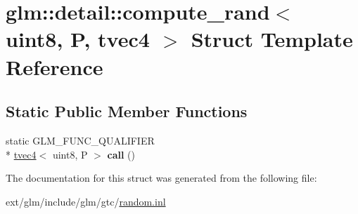 \hypertarget{structglm_1_1detail_1_1compute__rand_3_01uint8_00_01_p_00_01tvec4_01_4}{\section{glm\-:\-:detail\-:\-:compute\-\_\-rand$<$ uint8, P, tvec4 $>$ Struct Template Reference}
\label{structglm_1_1detail_1_1compute__rand_3_01uint8_00_01_p_00_01tvec4_01_4}
}
\subsection*{Static Public Member Functions}
\begin{DoxyCompactItemize}
\item 
\hypertarget{structglm_1_1detail_1_1compute__rand_3_01uint8_00_01_p_00_01tvec4_01_4_ad9fa915c8140a6fa885534d8c60e35fd}{static G\-L\-M\-\_\-\-F\-U\-N\-C\-\_\-\-Q\-U\-A\-L\-I\-F\-I\-E\-R \\*
\hyperlink{structglm_1_1tvec4}{tvec4}$<$ uint8, P $>$ {\bfseries call} ()}\label{structglm_1_1detail_1_1compute__rand_3_01uint8_00_01_p_00_01tvec4_01_4_ad9fa915c8140a6fa885534d8c60e35fd}

\end{DoxyCompactItemize}


The documentation for this struct was generated from the following file\-:\begin{DoxyCompactItemize}
\item 
ext/glm/include/glm/gtc/\hyperlink{random_8inl}{random.\-inl}\end{DoxyCompactItemize}
